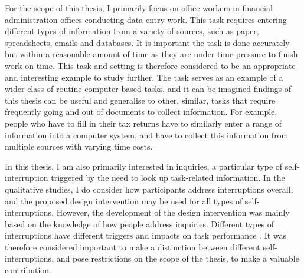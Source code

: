 
For the scope of this thesis, I primarily focus on office workers in financial administration offices conducting data entry work. This task requires entering different types of information from a variety of sources, such as paper, spreadsheets, emails and databases. It is important the task is done accurately but within a reasonable amount of time as they are under time pressure to finish work on time. This task and setting is therefore considered to be an appropriate and interesting example to study further. The task serves as an example of a wider class of routine computer-based tasks, and it can be imagined findings of this thesis can be useful and generalise to other, similar, tasks that require frequently going and out of documents to collect information. For example, people who have to fill in their tax returns have to similarly enter a range of information into a computer system, and have to collect this information from multiple sources with varying time costs.

In this thesis, I am also primarily interested in inquiries, a particular type of self-interruption triggered by the need to look up task-related information. 
In the qualitative studies, I do consider how participants address interruptions overall, and the proposed design intervention may be used for all types of self-interruptions. However, the development of the design intervention was mainly based on the knowledge of how people address inquiries. Different types of interruptions have different triggers and impacts on task performance \citep{Jin2009}. It was therefore considered important to make a distinction between different self-interruptions, and pose restrictions on the scope of the thesis, to make a valuable contribution.


